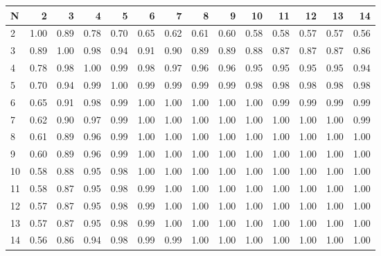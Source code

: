 \begin{tabular}{lrrrrrrrrrrrrr}
\toprule
N &    2  &    3  &    4  &    5  &    6  &    7  &    8  &    9  &    10 &    11 &    12 &    13 &    14 \\
\midrule
2  &  1.00 &  0.89 &  0.78 &  0.70 &  0.65 &  0.62 &  0.61 &  0.60 &  0.58 &  0.58 &  0.57 &  0.57 &  0.56 \\
3  &  0.89 &  1.00 &  0.98 &  0.94 &  0.91 &  0.90 &  0.89 &  0.89 &  0.88 &  0.87 &  0.87 &  0.87 &  0.86 \\
4  &  0.78 &  0.98 &  1.00 &  0.99 &  0.98 &  0.97 &  0.96 &  0.96 &  0.95 &  0.95 &  0.95 &  0.95 &  0.94 \\
5  &  0.70 &  0.94 &  0.99 &  1.00 &  0.99 &  0.99 &  0.99 &  0.99 &  0.98 &  0.98 &  0.98 &  0.98 &  0.98 \\
6  &  0.65 &  0.91 &  0.98 &  0.99 &  1.00 &  1.00 &  1.00 &  1.00 &  1.00 &  0.99 &  0.99 &  0.99 &  0.99 \\
7  &  0.62 &  0.90 &  0.97 &  0.99 &  1.00 &  1.00 &  1.00 &  1.00 &  1.00 &  1.00 &  1.00 &  1.00 &  0.99 \\
8  &  0.61 &  0.89 &  0.96 &  0.99 &  1.00 &  1.00 &  1.00 &  1.00 &  1.00 &  1.00 &  1.00 &  1.00 &  1.00 \\
9  &  0.60 &  0.89 &  0.96 &  0.99 &  1.00 &  1.00 &  1.00 &  1.00 &  1.00 &  1.00 &  1.00 &  1.00 &  1.00 \\
10 &  0.58 &  0.88 &  0.95 &  0.98 &  1.00 &  1.00 &  1.00 &  1.00 &  1.00 &  1.00 &  1.00 &  1.00 &  1.00 \\
11 &  0.58 &  0.87 &  0.95 &  0.98 &  0.99 &  1.00 &  1.00 &  1.00 &  1.00 &  1.00 &  1.00 &  1.00 &  1.00 \\
12 &  0.57 &  0.87 &  0.95 &  0.98 &  0.99 &  1.00 &  1.00 &  1.00 &  1.00 &  1.00 &  1.00 &  1.00 &  1.00 \\
13 &  0.57 &  0.87 &  0.95 &  0.98 &  0.99 &  1.00 &  1.00 &  1.00 &  1.00 &  1.00 &  1.00 &  1.00 &  1.00 \\
14 &  0.56 &  0.86 &  0.94 &  0.98 &  0.99 &  0.99 &  1.00 &  1.00 &  1.00 &  1.00 &  1.00 &  1.00 &  1.00 \\
\bottomrule
\end{tabular}
